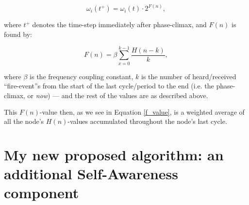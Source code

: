 			\begin{equation}
			\label{freq_adj}
				\omega_i(t^+) = \omega_i(t) \cdot 2^{F(n)},
			\end{equation}
			
			where $t^+$ denotes the time-step immediately after phase-climax, and $F(n)$ is found by:
			
			\begin{equation}
			\label{f_value}
				F(n) = \beta\sum_{x=0}^{k-1}\frac{H(n-k)}{k},
			\end{equation}
			
			where $\beta$ is the frequency coupling constant, $k$ is the number of heard/received ``fire-event''s from the start of the last cycle/period to the end (i.e. the phase-climax, or \textit{now}) — and the rest of the values are as described above.
			
			This $F(n)$-value then, as we see in Equation \eqref{f_value}, is a weighted average of all the node's $H(n)$-values accumulated throughout the node's last cycle.

\section{My new proposed algorithm: an additional Self-Awareness component}
